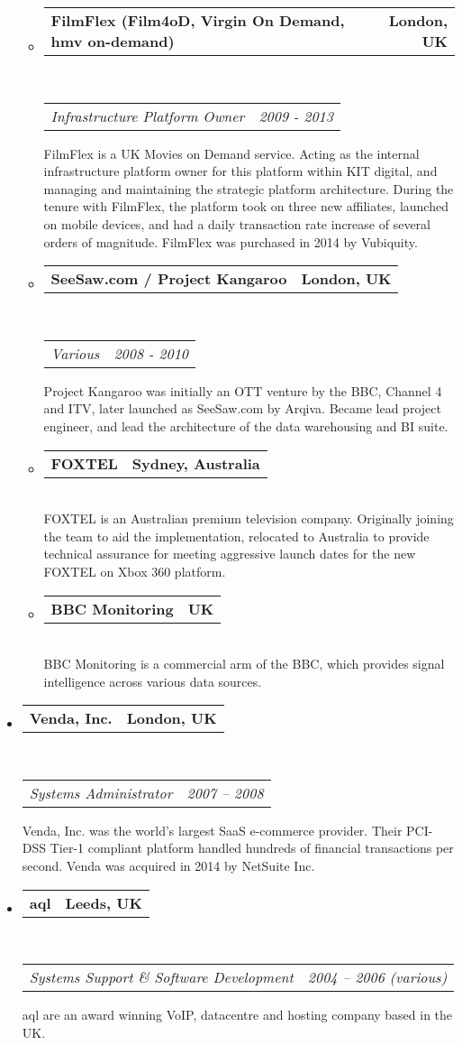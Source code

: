 \documentclass[10pt,a4paper]{article}
\makeatletter
\newcommand{\headerrow}[2]
{\begin{tabular*}{\linewidth}{l@{\extracolsep{\fill}}r}
    #1 &
    #2 \\
\end{tabular*}}
\makeatother
\begin{document}
\begin{itemize}
\begin{itemize}
            \item 
            \headerrow
                {\textbf{FilmFlex (Film4oD, Virgin On Demand, hmv on-demand)}}
                {\textbf{London, UK}}
            \\
            \headerrow
                {\emph{Infrastructure Platform Owner}}
                {\emph{2009 - 2013}}
                FilmFlex is a UK Movies on Demand service. Acting as the internal infrastructure platform owner for this platform within KIT digital, and managing and maintaining the strategic platform architecture. During the tenure with FilmFlex, the platform took on three new affiliates, launched on mobile devices, and had a daily transaction rate increase of several orders of magnitude. FilmFlex was purchased in 2014 by Vubiquity.
            \item 
            \headerrow
                {\textbf{SeeSaw.com / Project Kangaroo}}
                {\textbf{London, UK}}
            \\
            \headerrow
                {\emph{Various}}
                {\emph{2008 - 2010}}
                Project Kangaroo was initially an OTT venture by the BBC, Channel 4 and ITV, later launched as SeeSaw.com by Arqiva. Became lead project engineer, and lead the architecture of the data warehousing and BI suite.
            \item 
            \headerrow
                {\textbf{FOXTEL}}
                {\textbf{Sydney, Australia}}
            \\
                FOXTEL is an Australian premium television company. Originally joining the team to aid the implementation, relocated to Australia to provide technical assurance for meeting aggressive launch dates for the new FOXTEL on Xbox 360 platform.
            \item 
            \headerrow
                {\textbf{BBC Monitoring}}
                {\textbf{UK}}
            \\
                BBC Monitoring is a commercial arm of the BBC, which provides signal intelligence across various data sources.
        \end{itemize}

    \item
        \headerrow
            {\textbf{Venda, Inc.}}
            {\textbf{London, UK}}
        \\
        \headerrow
            {\emph{Systems Administrator}}
            {\emph{2007 -- 2008}}
    
            Venda, Inc. was the world's largest SaaS e-commerce provider. Their PCI-DSS Tier-1 compliant platform handled hundreds of financial transactions per second. Venda was acquired in 2014 by NetSuite Inc.
    \item
        \headerrow
            {\textbf{aql}}
            {\textbf{Leeds, UK}}
        \\
        \headerrow
            {\emph{Systems Support \& Software Development}}
            {\emph{2004 -- 2006 (various)}}
    
            aql are an award winning VoIP, datacentre and hosting company based in the UK.
\end{itemize}
\end{document}

